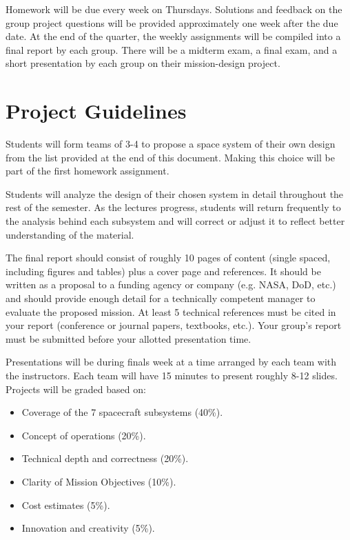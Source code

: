 \documentclass[11pt,letterpaper]{article}
\begin{document}
Homework will be due every week on Thursdays. Solutions and feedback on the group project questions will be provided approximately one week after the due date. At the end of the quarter, the weekly assignments will be compiled into a final report by each group. There will be a midterm exam, a final exam, and a short presentation by each group on their mission-design project.

\section*{Project Guidelines}

Students will form teams of 3-4 to propose a space system of their own design from the list provided at the end of this document. Making this choice will be part of the first homework assignment.

Students will analyze the design of their chosen system in detail throughout the rest of the semester. As the lectures progress, students will return frequently to the analysis behind each subsystem and will correct or adjust it to reflect better understanding of the material.

The final report should consist of roughly 10 pages of content (single spaced, including figures and tables) plus a cover page and references. It should be written as a proposal to a funding agency or company (e.g. NASA, DoD, etc.) and should provide enough detail for a technically competent manager to evaluate the proposed mission. At least 5 technical references must be cited in your report (conference or journal papers, textbooks, etc.). Your group's report must be submitted before your allotted presentation time.

Presentations will be during finals week at a time arranged by each team with the instructors. Each team will have 15 minutes to present roughly 8-12 slides. Projects will be graded based on:
\begin{itemize}
	\item Coverage of the 7 spacecraft subsystems (40\%).
	\item Concept of operations (20\%).
	\item Technical depth and correctness (20\%).
	\item Clarity of Mission Objectives (10\%).
	\item Cost estimates (5\%).
	\item Innovation and creativity (5\%).
\end{itemize}
\end{document}
